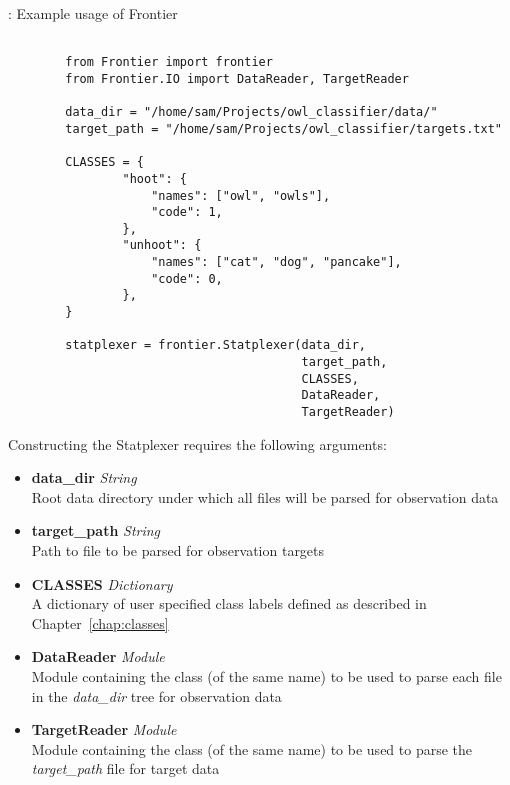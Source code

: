\begin{listing}[H]
    \caption[callstatplexer]{: Example usage of Frontier}
    \label{list:callstatplexer}
    \begin{verbatim}

        from Frontier import frontier
        from Frontier.IO import DataReader, TargetReader

        data_dir = "/home/sam/Projects/owl_classifier/data/"
        target_path = "/home/sam/Projects/owl_classifier/targets.txt"

        CLASSES = {
                "hoot": {
                    "names": ["owl", "owls"],
                    "code": 1,
                },
                "unhoot": {
                    "names": ["cat", "dog", "pancake"],
                    "code": 0,
                },
        }

        statplexer = frontier.Statplexer(data_dir,
                                         target_path,
                                         CLASSES,
                                         DataReader,
                                         TargetReader)
    \end{verbatim}
\end{listing}

Constructing the Statplexer requires the following arguments:

\begin{itemize}
    \item \textbf{data\_dir} \textit{String}\hfill\\
        Root data directory under which all files will be parsed for observation data
    \item \textbf{target\_path} \textit{String}\hfill\\
        Path to file to be parsed for observation targets
    \item \textbf{CLASSES} \textit{Dictionary}\hfill\\
        A dictionary of user specified class labels defined as described in
        Chapter~\ref{chap:classes}
    \item \textbf{DataReader} \textit{Module}\hfill\\
        Module containing the class (of the same name) to be used to parse each
        file in the \textit{data\_dir} tree for observation data
    \item \textbf{TargetReader} \textit{Module}\hfill\\
        Module containing the class (of the same name) to be used to parse the
        \textit{target\_path} file for target data
\end{itemize}


